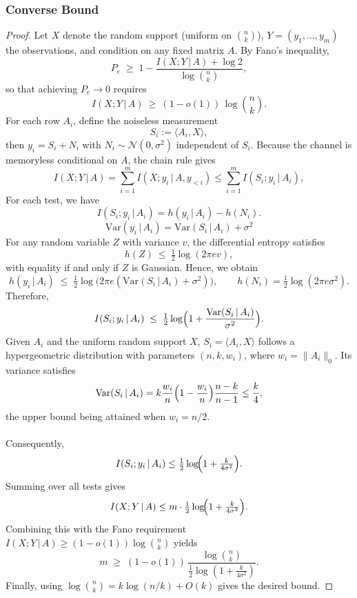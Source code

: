 \documentclass{article}
\begin{document}
\subsubsection{Converse Bound}
\begin{proof}
Let $X$ denote the random support (uniform on $\binom{n}{k}$), $Y=(y_1,\dots,y_m)$ the observations, and condition on any fixed matrix $A$.  
By Fano’s inequality,
\[
P_e \;\ge\; 1 - \frac{I(X;Y\,|\,A)+\log 2}{\log \binom{n}{k}},
\]
so that achieving $P_e\to 0$ requires
\[
I(X;Y\,|\,A)\ \ge\ (1-o(1))\,\log\binom{n}{k}.
\]
For each row $A_i$, define the noiseless measurement
\[
S_i := \langle A_i, X\rangle,
\]
then $y_i = S_i + N_i$ with $N_i\sim\mathcal{N}(0,\sigma^2)$ independent of $S_i$.  
Because the channel is memoryless conditional on $A$, the chain rule gives
\[
I(X;Y\,|\,A)
= \sum_{i=1}^m I(X;y_i\,|\,A,y_{<i})
\le \sum_{i=1}^m I(S_i;y_i\,|\,A_i),
\]
For each test, we have
\[
I(S_i;y_i\,|\,A_i)
= h(y_i\,|\,A_i) - h(N_i).
\]
\[\mathrm{Var}(y_i\,|\,A_i) = \mathrm{Var}(S_i\,|\,A_i) + \sigma^2\]
For any random variable $Z$ with variance $v$, the differential entropy satisfies
\[
h(Z)\ \le\ \tfrac{1}{2}\log(2\pi e v),
\]
with equality if and only if $Z$ is Gaussian.  
Hence, we obtain
\[
h(y_i\,|\,A_i) \;\le\; \tfrac{1}{2}\log \bigl(2\pi e(\mathrm{Var}(S_i\,|\,A_i)+\sigma^2)\bigr),
\qquad
h(N_i) = \tfrac{1}{2}\log(2\pi e\sigma^2).
\]
Therefore,
\[
I(S_i;y_i\,|\,A_i)
\;\le\;
\tfrac{1}{2}\log\Bigl(1+\frac{\mathrm{Var}(S_i\,|\,A_i)}{\sigma^2}\Bigr).
\]
Given $A_i$ and the uniform random support $X$, $S_i = \langle A_i,X\rangle$ follows a hypergeometric distribution with parameters $(n,k,w_i)$, where $w_i=\|A_i\|_0$. Its variance satisfies
\[
\mathrm{Var}(S_i\,|\,A_i)
= k\frac{w_i}{n}\Bigl(1-\frac{w_i}{n}\Bigr)\frac{n-k}{n-1}
\le \frac{k}{4},
\]
the upper bound being attained when $w_i=n/2$.  
\\\\
Consequently,
\[
I(S_i;y_i\,|\,A_i)
\le \tfrac{1}{2}\log\!\Bigl(1+\tfrac{k}{4\sigma^2}\Bigr).
\]
Summing over all tests gives
\[
I(X;Y\,|\,A)
\le m\cdot \tfrac{1}{2}\log\!\Bigl(1+\tfrac{k}{4\sigma^2}\Bigr).
\]
Combining this with the Fano requirement $I(X;Y\,|\,A)\ge (1-o(1))\log\binom{n}{k}$ yields
\[
m \;\ge\; (1-o(1))\,\frac{\log\binom{n}{k}}{\tfrac{1}{2}\log(1+\tfrac{k}{4\sigma^2})}.
\]
Finally, using $\log\binom{n}{k}=k\log(n/k)+O(k)$ gives the desired bound.
\end{proof}
\end{document}
